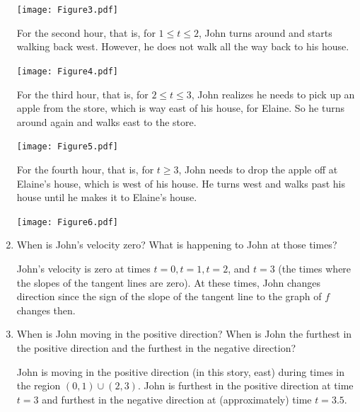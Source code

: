 \documentclass[nooutcomes]{ximera}
\begin{document}
\begin{problem}
\begin{enumerate}
\begin{freeResponse}
		\begin{image}
		\texttt{[image: Figure3.pdf]}
		\end{image}
	
		For the second hour, that is, for $1 \leq t \leq 2$, John turns around and starts walking back west.  However, he does not walk all the way back to his house.
		
		\begin{image}
		\texttt{[image: Figure4.pdf]}
		\end{image}
		
		For the third hour, that is, for $2\le t\le 3$, John realizes he needs to pick up an apple from the store, which is way east of his house, for Elaine.  So he turns around again and walks east to the store.
		
		\begin{image}
		\texttt{[image: Figure5.pdf]}
		\end{image}
		
		For the fourth hour, that is, for $t \ge 3$, John needs to drop the apple off at Elaine's house, which is west of his house.  He turns west and walks past his house until he makes it to Elaine's house.
		
		\begin{image}
		\texttt{[image: Figure6.pdf]}
		\end{image}

		\end{freeResponse}
		
		
		
	\item  When is John's velocity zero?  What is happening to John at those times? 
		\begin{freeResponse}
		John's velocity is zero at times $t=0,t=1,t=2$, and $t=3$ (the times where the slopes of the tangent lines are zero). At these times, John changes direction since the sign of the slope of the tangent line to the graph of $f$ changes then.
		\end{freeResponse}
		
		
		
	\item  When is John moving in the positive direction?  When is John the furthest in the positive direction and the furthest in the negative direction?
		\begin{freeResponse}
		John is moving in the positive direction (in this story, east) during times in the region $(0,1) \cup (2,3)$.  John is furthest in the positive direction at time $t=3$ and furthest in the negative direction at (approximately) time $t=3.5$.
		\end{freeResponse}
		

\end{enumerate}
\end{problem}
\end{document}
